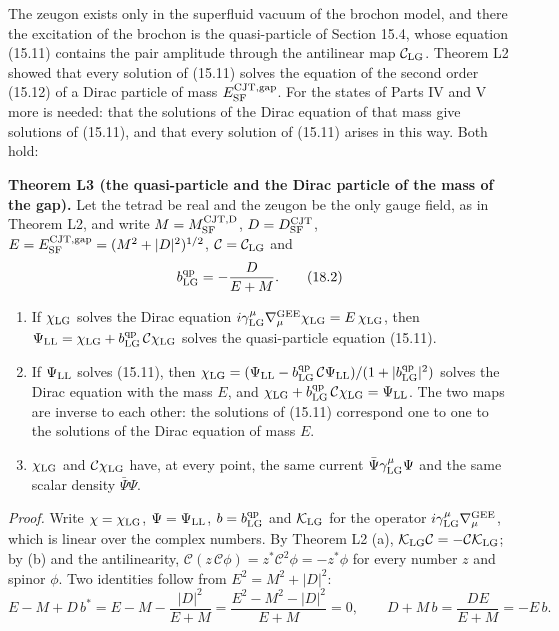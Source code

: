 \documentclass[
  10pt,
]{article}
\begin{document}
The zeugon exists only in the superfluid vacuum of the brochon model,
and there the excitation of the brochon is the quasi-particle of Section
15.4, whose equation (15.11) contains the pair amplitude through the
antilinear map \(\mathcal C_{\rm LG}\). Theorem L2 showed that every
solution of (15.11) solves the equation of the second order (15.12) of a
Dirac particle of mass \(E^{\rm CJT,gap}_{\rm SF}\). For the states of
Parts IV and V more is needed: that the solutions of the Dirac equation
of that mass give solutions of (15.11), and that every solution of
(15.11) arises in this way. Both hold:

\textbf{Theorem L3 (the quasi-particle and the Dirac particle of the
mass of the gap).} Let the tetrad be real and the zeugon be the only
gauge field, as in Theorem L2, and write \(M=M^{\rm CJT,D}_{\rm SF}\),
\(D=D^{\rm CJT}_{\rm SF}\),
\(E=E^{\rm CJT,gap}_{\rm SF}=(M^2+\lvert D\rvert^2)^{1/2}\),
\(\mathcal C=\mathcal C_{\rm LG}\) and
\[b^{\rm qp}_{\rm LG}=-\frac{D}{E+M}.\tag{18.2}\]

\begin{enumerate}
\def\labelenumi{(\alph{enumi})}
\item
  If \(\chi_{\rm LG}\) solves the Dirac equation
  \(i\gamma^\mu_{\rm LG}\nabla^{\rm GEE}_\mu\chi_{\rm LG}=E\,\chi_{\rm LG}\),
  then
  \(\Psi_{\rm LL}=\chi_{\rm LG}+b^{\rm qp}_{\rm LG}\,\mathcal C\chi_{\rm LG}\)
  solves the quasi-particle equation (15.11).
\item
  If \(\Psi_{\rm LL}\) solves (15.11), then
  \(\chi_{\rm LG}=(\Psi_{\rm LL}-b^{\rm qp}_{\rm LG}\,\mathcal C\Psi_{\rm LL})/(1+\lvert b^{\rm qp}_{\rm LG}\rvert^2)\)
  solves the Dirac equation with the mass \(E\), and
  \(\chi_{\rm LG}+b^{\rm qp}_{\rm LG}\,\mathcal C\chi_{\rm LG}=\Psi_{\rm LL}\).
  The two maps are inverse to each other: the solutions of (15.11)
  correspond one to one to the solutions of the Dirac equation of mass
  \(E\).
\item
  \(\chi_{\rm LG}\) and \(\mathcal C\chi_{\rm LG}\) have, at every
  point, the same current \(\bar\Psi\gamma^\mu_{\rm LG}\Psi\) and the
  same scalar density \(\bar\Psi\Psi\).
\end{enumerate}

\emph{Proof.} Write \(\chi=\chi_{\rm LG}\), \(\Psi=\Psi_{\rm LL}\),
\(b=b^{\rm qp}_{\rm LG}\) and \(\mathcal K_{\rm LG}\) for the operator
\(i\gamma^\mu_{\rm LG}\nabla^{\rm GEE}_\mu\), which is linear over the
complex numbers. By Theorem L2 (a),
\(\mathcal K_{\rm LG}\mathcal C=-\mathcal C \mathcal K_{\rm LG}\); by
(b) and the antilinearity,
\(\mathcal C(z\,\mathcal C\phi)=z^*\mathcal C^2\phi=-z^*\phi\) for every
number \(z\) and spinor \(\phi\). Two identities follow from
\(E^2=M^2+\lvert D\rvert^2\):
\[E-M+D\,b^*=E-M-\frac{\lvert D\rvert^2}{E+M}=\frac{E^2-M^2-\lvert D\rvert^2}{E+M}=0,\qquad D+M\,b=\frac{DE}{E+M}=-E\,b.\]
\end{document}
